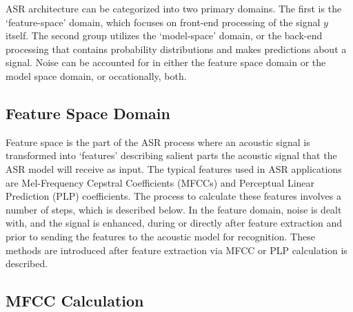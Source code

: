 ASR architecture can be categorized into two primary domains. The first is the `feature-space' domain, which focuses on front-end processing of the signal $y$ itself.  The second group utilizes the `model-space' domain, or the back-end processing that contains probability distributions and makes predictions about a signal. %
Noise can be accounted for in either the feature space domain or the model space domain, or occationally, both.  %

\subsection{Feature Space Domain}

Feature space is the part of the ASR process where an acoustic signal is transformed into `features' describing salient parts the acoustic signal that the ASR model will receive as input. The typical features used in ASR applications are Mel-Frequency Cepstral Coefficients (MFCCs) and Perceptual Linear Prediction (PLP) coefficients. The process to calculate these features involves a number of steps, which is described below.  In the feature domain, noise is dealt with, and the signal is enhanced, during or directly after feature extraction and prior to sending the features to the acoustic model for recognition.  These methods are introduced after feature extraction via MFCC or PLP calculation is described.

\DIFdelbegin \subsubsection{}%
\addtocounter{subsubsection}{-1}%
\DIFdelend \DIFaddbegin \subsection{MFCC Calculation}\DIFaddend \label{sec:mfcc-calc}


